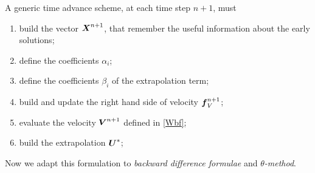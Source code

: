 \documentclass[english,a4paper]{article}
\newcommand{\Xbf}{\text{\mbox{\boldmath $X$}}}
\newcommand{\Ubf}{\text{\mbox{\boldmath $U$}}}
\newcommand{\fbf}{\text{\mbox{\boldmath $f$}}}
\newcommand{\Wbf}{\text{\mbox{\boldmath $V$}}}
\begin{document}
A generic time advance scheme, at each time step $n+1$, must 
\begin{enumerate}
\item build the vector $\Xbf^{n+1}$, that remember the useful information about the early solutions;
\item define the coefficients $\alpha_i$;
\item define the coefficients $\beta_i$ of the extrapolation term;
\item build and update the right hand side of velocity $\fbf_V^{n+1}$; 
\item evaluate the velocity $\Wbf^{n+1}$ defined in \eqref{Wbf};
\item build the extrapolation $\Ubf^*$;
\end{enumerate}
Now we adapt this formulation to {\sl backward difference formulae}
and $\theta${\sl-method}.
\end{document}
